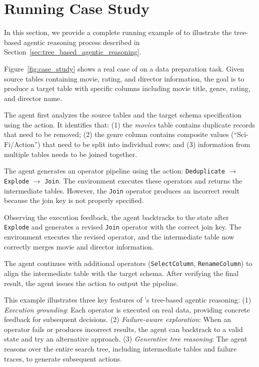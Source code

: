 
\section{Running Case Study}
\label{sec:appendix_case_study}

In this section, we provide a complete running example of \sys to illustrate the tree-based agentic reasoning process described in Section~\ref{sec:tree_based_agentic_reasoning}.



Figure~\ref{fig:case_study} shows a real case of \sys on a data preparation task. Given source tables containing movie, rating, and director information, the goal is to produce a target table with specific columns including movie title, genre, rating, and director name.

The agent first analyzes the source tables and the target schema specification using the  action. It identifies that: (1) the \textit{movies} table contains duplicate records that need to be removed; (2) the genre column contains composite values (\eg ``Sci-Fi/Action'') that need to be split into individual rows; and (3) information from multiple tables needs to be joined together.

The agent generates an operator pipeline using the  action: \texttt{Deduplicate} $\to$ \texttt{Explode} $\to$ \texttt{Join}. The environment executes these operators and returns the intermediate tables. However, the \texttt{Join} operator produces an incorrect result because the join key is not properly specified.

Observing the execution feedback, the agent backtracks to the state after \texttt{Explode} and generates a revised \texttt{Join} operator with the correct join key. The environment executes the revised operator, and the intermediate table now correctly merges movie and director information.

The agent continues with additional operators (\texttt{SelectColumn}, \texttt{RenameColumn}) to align the intermediate table with the target schema. After verifying the final result, the agent issues the  action to output the pipeline.

This example illustrates three key features of \sys's tree-based agentic reasoning:
(1) \emph{Execution grounding}: Each operator is executed on real data, providing concrete feedback for subsequent decisions.
(2) \emph{Failure-aware exploration}: When an operator fails or produces incorrect results, the agent can backtrack to a valid state and try an alternative approach.
(3) \emph{Generative tree reasoning}: The agent reasons over the entire search tree, including intermediate tables and failure traces, to generate subsequent actions.
